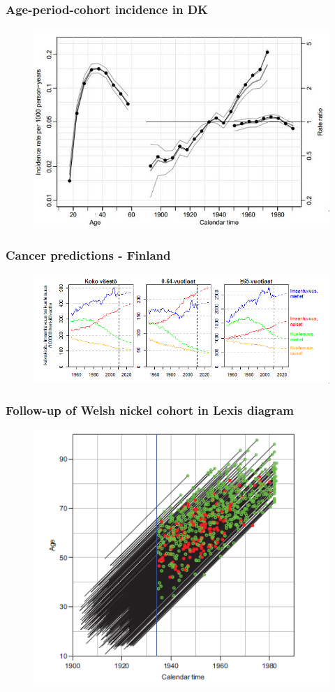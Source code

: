 \documentclass[handout,12pt]{beamer}
\begin{document}
\begin{frame}
\frametitle{Age-period-cohort incidence in DK}
\begin{figure}
\centering
\includegraphics[width=0.8\linewidth]{APC_testis_cancer_dk}
\end{figure}
\end{frame}

\begin{frame}
\frametitle{Cancer predictions - Finland}
\begin{figure}
\centering
\includegraphics[width=1.1\linewidth]{Cancer_Finland}
\end{figure}
\end{frame}


\begin{frame}
\frametitle{Follow-up of Welsh nickel cohort in Lexis diagram}
\begin{figure}
\centering
\includegraphics[width=0.8\linewidth]{Welsh}
\end{figure}
\end{frame}
\end{document}
